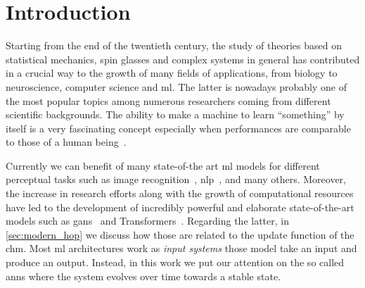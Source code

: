 \documentclass[\rootdir/main.tex]{subfiles}
\begin{document}
\chapter*{Introduction}
Starting from the end of the twentieth century, the study of theories based on statistical mechanics, spin glasses and complex systems in general has contributed in a crucial way to the growth of many fields of applications, from biology to neuroscience, computer science and \acrfull{ml}. The latter is nowadays probably one of the most popular topics among numerous researchers coming from different scientific backgrounds. The ability to make a machine to learn ``something'' by itself is a very fascinating concept especially when performances are comparable to those of a human being~\cite{imagenet, ml_vs_human, vandermaas}.

Currently we can benefit of many state-of-the art \acrlong{ml} models for different perceptual tasks such as image recognition~\cite{resnet, vgg}, \acrfull{nlp}~\cite{lstm}, and many others. Moreover, the increase in research efforts along with the growth of computational resources have led to the development of incredibly powerful and elaborate state-of-the-art models such as \glspl{gan}~\cite{gans} and Transformers~\cite{attention}. Regarding the latter, in \cref{sec:modern_hop} we discuss how those are related to the update function of the \acrfull{chm}.
Most \acrlong{ml} architectures work as \emph{input systems} \ie those model take an input and produce an output. Instead, in this work we put our attention on the so called \glspl{ann} where the system evolves over time towards a stable state.
\end{document}
